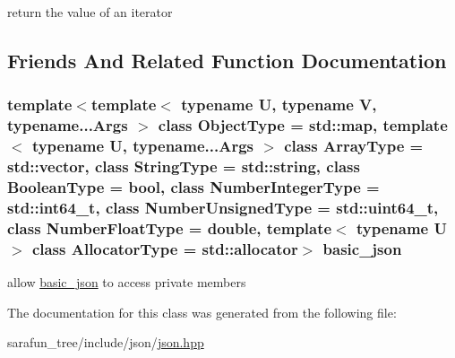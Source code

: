 return the value of an iterator 



\subsection{Friends And Related Function Documentation}
\hypertarget{classnlohmann_1_1basic__json_1_1const__iterator_a069a4f73a702f4c2bc0d14ca1565a7b0}{
\subsubsection[{basic\-\_\-json}]{\setlength{\rightskip}{0pt plus 5cm}template$<$template$<$ typename U, typename V, typename...\-Args $>$ class Object\-Type = std\-::map, template$<$ typename U, typename...\-Args $>$ class Array\-Type = std\-::vector, class String\-Type  = std\-::string, class Boolean\-Type  = bool, class Number\-Integer\-Type  = std\-::int64\-\_\-t, class Number\-Unsigned\-Type  = std\-::uint64\-\_\-t, class Number\-Float\-Type  = double, template$<$ typename U $>$ class Allocator\-Type = std\-::allocator$>$ {\bf basic\-\_\-json}\hspace{0.3cm}{\ttfamily [friend]}}}\label{classnlohmann_1_1basic__json_1_1const__iterator_a069a4f73a702f4c2bc0d14ca1565a7b0}


allow \hyperlink{classnlohmann_1_1basic__json}{basic\-\_\-json} to access private members 



The documentation for this class was generated from the following file\-:\begin{DoxyCompactItemize}
\item 
sarafun\-\_\-tree/include/json/\hyperlink{sarafun__tree_2include_2json_2json_8hpp}{json.\-hpp}\end{DoxyCompactItemize}
